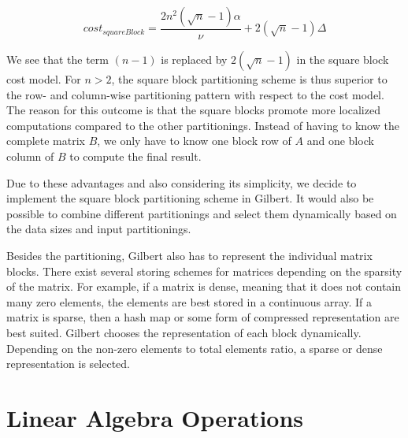 \begin{displaymath}
	cost_{squareBlock} = \frac{2n^2\left(\sqrt{n}-1\right)\alpha}{\nu} + 2\left(\sqrt{n}-1\right)\Delta
\end{displaymath}

We see that the term $(n-1)$ is replaced by $2\left(\sqrt{n}-1\right)$ in the square block cost model.
For $n>2$, the square block partitioning scheme is thus superior to the row- and column-wise partitioning pattern with respect to the cost model.
The reason for this outcome is that the square blocks promote more localized computations compared to the other partitionings.
Instead of having to know the complete matrix $B$, we only have to know one block row of $A$ and one block column of $B$ to compute the final result.

Due to these advantages and also considering its simplicity, we decide to implement the square block partitioning scheme in Gilbert.
It would also be possible to combine different partitionings and select them dynamically based on the data sizes and input partitionings.

Besides the partitioning, Gilbert also has to represent the individual matrix blocks.
There exist several storing schemes for matrices depending on the sparsity of the matrix.
For example, if a matrix is dense, meaning that it does not contain many zero elements, the elements are best stored in a continuous array.
If a matrix is sparse, then a hash map or some form of compressed representation are best suited.
Gilbert chooses the representation of each block dynamically.
Depending on the non-zero elements to total elements ratio, a sparse or dense representation is selected.

\section{Linear Algebra Operations}
\label{sec:LinearAlgebraOperations}

